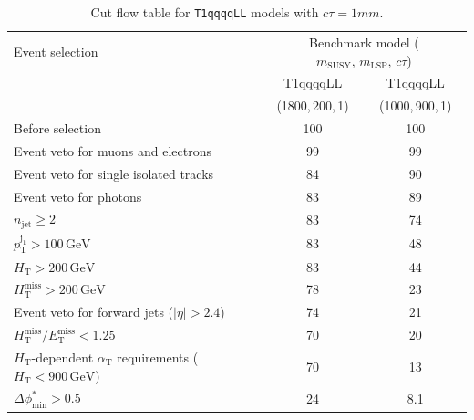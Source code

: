 \begin{table}[!h]
  \caption{Cut flow table for \texttt{T1qqqqLL} models with $c\tau = 1\unit{mm}$.} 
  \label{tab:cut_flow_ctau_1}
{\scriptsize%
\centering
\begin{tabular}{lcc}
  \hline
  Event selection & \multicolumn{2}{c}{Benchmark model ($m_\mathrm{SUSY},\,m_\mathrm{LSP},\,c\tau$)} \\
  \cline{2-3}
   & T1qqqqLL & T1qqqqLL \\
    & (1800,\,200,\,1) & (1000,\,900,\,1) \\
  \hline
  Before selection  & 100\phantom{.1} & 100\phantom{.1} \\
  Event veto for muons and electrons & \phantom{1}99\phantom{.1} & \phantom{1}99\phantom{.1} \\
  Event veto for single isolated tracks & \phantom{1}84\phantom{.1} & \phantom{1}90\phantom{.1} \\
  Event veto for photons & \phantom{1}83\phantom{.1} & \phantom{1}89\phantom{.1} \\
   $n_{\mathrm{jet}} \geq 2$  & \phantom{1}83\phantom{.1} & \phantom{1}74\phantom{.1} \\
   $p_{\mathrm{T}}^{\mathrm{j_1}} > 100\,\mathrm{GeV}$ & \phantom{1}83\phantom{.1} & \phantom{1}48\phantom{.1} \\
   $H_{\mathrm{T}} > 200\,\mathrm{GeV}$  & \phantom{1}83\phantom{.1} & \phantom{1}44\phantom{.1} \\
  $H_{\mathrm{T}}^{\mathrm{miss}} > 200\,\mathrm{GeV}$  & \phantom{1}78\phantom{.1} & \phantom{1}23\phantom{.1} \\
  Event veto for forward jets ($|\eta| > 2.4$) & \phantom{1}74\phantom{.1} & \phantom{1}21\phantom{.1} \\
  $H_{\mathrm{T}}^{\mathrm{miss}} / E_{\mathrm{T}}^{\mathrm{miss}} < 1.25$ & \phantom{1}70\phantom{.1} & \phantom{1}20\phantom{.1} \\
  $H_{\mathrm{T}}$-dependent $\alpha_{\mathrm{T}}$ requirements ($H_{\mathrm{T}} < 900\,\mathrm{GeV}$)  & \phantom{1}70\phantom{.1} & \phantom{1}13\phantom{.1} \\
  $\Delta\phi^{*}_{\mathrm{min}} > 0.5$  & \phantom{1}24\phantom{.1} & \phantom{10}8.1 \\
  \hline
\end{tabular}
}
\end{table}

